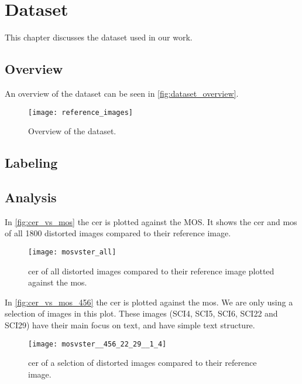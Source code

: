 \chapter{Dataset}
\label{ch:dataset}
This chapter discusses the dataset used in our work.

\section{Overview}
\label{sec:dataset_overview}
An overview of the dataset can be seen in \autoref{fig:dataset_overview}.

\begin{figure}[h]
    \centering
    \texttt{[image: reference\_images]}
    \caption{Overview of the dataset.}
    \label{fig:dataset_overview}
\end{figure}

\section{Labeling}
\label{sec:dataset_labeling}

\section{Analysis}
\label{sec:dataset_analysis}

In \autoref{fig:cer_vs_mos} the cer is plotted against the MOS.
It shows the \gls{cer} and \gls{mos} of all 1800 distorted images compared to their reference image.

\begin{figure}[h]
    \centering
    \texttt{[image: mosvster\_all]}
    \caption{\gls{cer} of all distorted images compared to their reference image plotted against the \gls{mos}.}
    \label{fig:cer_vs_mos}
\end{figure}

In \autoref{fig:cer_vs_mos_456} the \gls{cer} is plotted against the \gls{mos}.
We are only using a selection of images in this plot.
These images (SCI4, SCI5, SCI6, SCI22 and SCI29) have their main focus on text, and have simple text structure.
\begin{figure}[h]
    \centering
    \texttt{[image: mosvster\_\_456\_22\_29\_\_1\_4]}
    \caption{\gls{cer} of a selction of distorted images compared to their reference image.}
    \label{fig:cer_vs_mos_456}
\end{figure}
